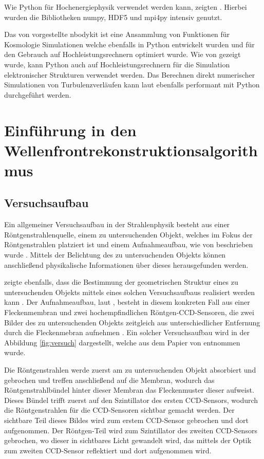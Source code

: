 Wie Python für Hochenergiephysik verwendet werden kann, zeigten \citeauthor{SKP+17}. \cite{SKP+17} Hierbei wurden die Bibliotheken numpy, HDF5 und mpi4py intensiv genutzt.

Das von \citeauthor{HF17} vorgestellte nbodykit ist eine Ansammlung von Funktionen für Kosmologie Simulationen welche ebenfalls in Python entwickelt wurden und für den Gebrauch auf Hochleistungsrechnern optimiert wurde. \cite{HF17} Wie \citeyear{ERS+11} von \citeauthor{ERS+11} gezeigt wurde, kann Python auch auf Hochleistungsrechnern für die Simulation elektronischer Strukturen verwendet werden. \cite{ERS+11} Das Berechnen direkt numerischer Simulationen von Turbulenzverläufen kann laut \citeauthor{ML16} ebenfalls performant mit Python durchgeführt werden. \cite{ML16}

\section{Einführung in den Wellenfrontrekonstruktionsalgorithmus}

\subsection{Versuchsaufbau}

Ein allgemeiner Versuchsaufbau in der Strahlenphysik besteht aus einer Röntgenstrahlenquelle, einem zu untersuchenden Objekt, welches im Fokus der Röntgenstrahlen platziert ist und einem Aufnahmeaufbau, wie von \citeauthor{Ber13} beschrieben wurde . Mittels der Belichtung des zu untersuchenden Objekts können anschließend physikalische Informationen über dieses herausgefunden werden.

\citeauthor{Ber13} zeigte ebenfalls, dass die Bestimmung der geometrischen Struktur eines zu untersuchenden Objekts mittels eines solchen Versuchsaufbaus realisiert werden kann . Der Aufnahmeaufbau, laut \citeauthor{Ber15}, besteht in diesem konkreten Fall aus einer Fleckenmembran und zwei hochempfindlichen Röntgen-\gls{CCD}-Sensoren, die zwei Bilder des zu untersuchenden Objekts zeitgleich aus unterschiedlicher Entfernung durch die Fleckenmebran aufnehmen . Ein solcher Versuchsaufbau wird in der Abbildung \ref{fig:versuch} dargestellt, welche aus dem Papier  von \citeauthor{Ber15} entnommen wurde. \cite{Ber15}

Die Röntgenstrahlen werde zuerst am zu untersuchenden Objekt absorbiert und gebrochen und treffen anschließend auf die Membran, wodurch das Röntgenstrahlbündel hinter dieser Membran das Fleckenmuster dieser aufweist. Dieses Bündel trifft zuerst auf den Szintillator des ersten \gls{CCD}-Sensors, wodurch die Röntgenstrahlen für die \gls{CCD}-Sensoren sichtbar gemacht werden. Der sichtbare Teil dieses Bildes wird zum erstem \gls{CCD}-Sensor gebrochen und dort aufgenommen. Der Röntgen-Teil wird zum Szintillator des zweiten \gls{CCD}-Sensors gebrochen, wo dieser in sichtbares Licht gewandelt wird, das mittels der Optik zum zweiten \gls{CCD}-Sensor reflektiert und dort aufgenommen wird. 


